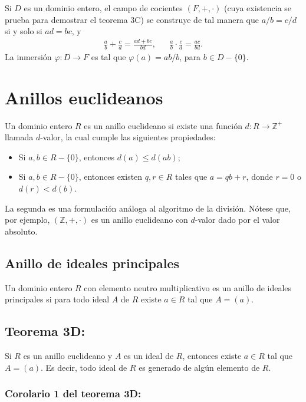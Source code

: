 \documentclass{article}
\begin{document}
Si $D$ es un dominio entero, el campo de cocientes $\left(F,+,\cdot\right)$ (cuya existencia se prueba para demostrar el teorema 3C) se construye de tal manera que $a/b=c/d$ si y solo si $ad=bc$, y
\begin{align*}
\frac{a}{b}+\frac{c}{d}=\frac{ad+bc}{bd}, && \frac{a}{b}\cdot\frac{c}{d}=\frac{ac}{bd}.
\end{align*}
La inmersión $\varphi: D\to F$ es tal que $\varphi(a)=ab/b$, para $b\in D-\{0\}$.

\newpage
\section{Anillos euclideanos}

Un dominio entero $R$ es un anillo euclideano si existe una función $d:R\to\mathbb{Z}^{+}$ llamada $d$-valor, la cual cumple las siguientes propiedades:

\begin{itemize}

\item Si $a,b\in R-\{0\}$, entonces $d(a)\leq d(ab)$;

\item Si $a,b\in R-\{0\}$, entonces existen $q,r\in R$ tales que $a=qb+r$, donde $r=0$ o $d(r)<d(b)$.

\end{itemize}

La segunda es una formulación análoga al algoritmo de la división. Nótese que, por ejemplo, $(\mathbb{Z},+,\cdot)$ es un anillo euclideano con $d$-valor dado por el valor absoluto.

\subsection*{\color{violet} Anillo de ideales principales}

Un dominio entero $R$ con elemento neutro multiplicativo es un anillo de ideales principales si para todo ideal $A$ de $R$ existe $a\in R$ tal que $A=(a)$.

\subsection*{\color{red} Teorema 3D:}

Si $R$ es un anillo euclideano y $A$ es un ideal de $R$, entonces existe $a\in R$ tal que $A=(a)$. Es decir, todo ideal de $R$ es generado de algún elemento de $R$.

\subsubsection*{\color{red} Corolario 1 del teorema 3D:}
\end{document}
